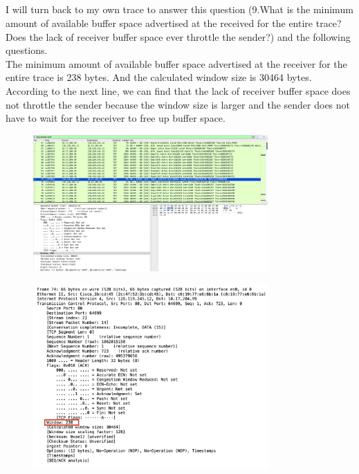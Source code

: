 \documentclass{article}
\begin{document}
\begin{CJK*}{UTF8}{gbsn}
\subsection{}
I will turn back to my own trace to answer this question 
(9.What is the minimum amount of available buffer space advertised at the received for the entire trace? Does the lack of receiver buffer space ever throttle the sender?)
and the following questions.
\\The minimum amount of available buffer space advertised at the receiver for the entire trace is 238
bytes. And the calculated window size is 30464 bytes. According to the next
line, we can find that the lack of receiver buffer space does not throttle the sender because the
window size is larger and the sender does not have to wait for the receiver to free up buffer space.
\begin{figure}[H]
    \centering
    \includegraphics[width=0.8\textwidth]{9-1.png}
\end{figure}
\begin{figure}[H]
    \centering
    \includegraphics[width=0.8\textwidth]{9-2.png}
\end{figure}


\end{CJK*}
\end{document}
